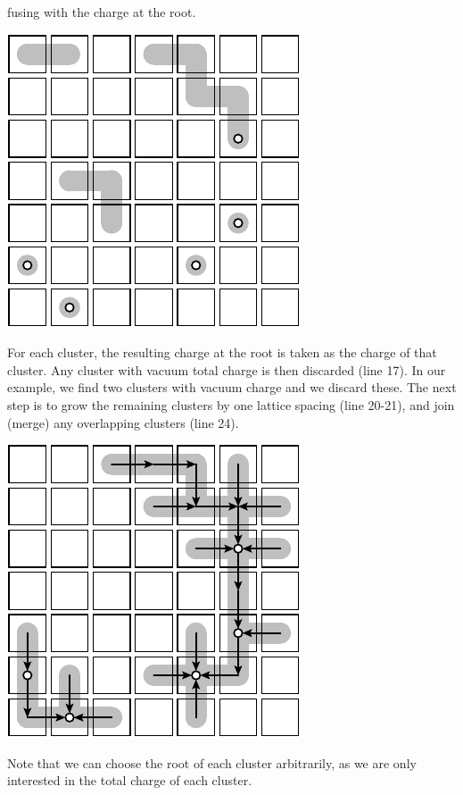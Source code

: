 \documentclass[aps, prl, letterpaper, twocolumn, superscriptaddress, notitlepage, 10pt]{revtex4-1}
\begin{document}
fusing with the charge at the root.
\begin{center}
\includegraphics[]{pic-decode-2.pdf}
\end{center}
For each cluster, the resulting charge at the root is taken as the charge of
that cluster. Any cluster with vacuum total charge is then discarded (line 17).
In our example, we find two clusters with vacuum charge and we discard these.
The next step is to grow the remaining clusters by one lattice spacing (line 20-21),
and join (merge) any overlapping clusters (line 24).
\begin{center}
\includegraphics[]{pic-decode-3.pdf}
\end{center}
Note that we can choose the root of each cluster arbitrarily,
as we are only interested in the total charge of each cluster.
\end{document}
